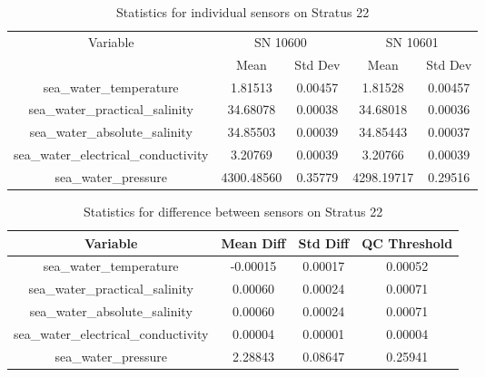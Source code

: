 \begin{table}[h]
\centering
\begin{tabular}{|c|c|c|c|c|}
\hline
Variable & \multicolumn{2}{c|}{SN 10600} & \multicolumn{2}{c|}{SN 10601} \\
& Mean & Std Dev & Mean & Std Dev \\
\hline
sea\_water\_temperature & 1.81513 & 0.00457 & 1.81528 & 0.00457 \\
sea\_water\_practical\_salinity & 34.68078 & 0.00038 & 34.68018 & 0.00036 \\
sea\_water\_absolute\_salinity & 34.85503 & 0.00039 & 34.85443 & 0.00037 \\
sea\_water\_electrical\_conductivity & 3.20769 & 0.00039 & 3.20766 & 0.00039 \\
sea\_water\_pressure & 4300.48560 & 0.35779 & 4298.19717 & 0.29516 \\
\hline
\end{tabular}
\caption{Statistics for individual sensors on Stratus 22}
\end{table}

\begin{table}[h]
\centering
\begin{tabular}{|c|c|c|c|}
\hline
Variable & Mean Diff & Std Diff & QC Threshold \\
\hline
sea\_water\_temperature & -0.00015 & 0.00017 & 0.00052 \\
sea\_water\_practical\_salinity & 0.00060 & 0.00024 & 0.00071 \\
sea\_water\_absolute\_salinity & 0.00060 & 0.00024 & 0.00071 \\
sea\_water\_electrical\_conductivity & 0.00004 & 0.00001 & 0.00004 \\
sea\_water\_pressure & 2.28843 & 0.08647 & 0.25941 \\
\hline
\end{tabular}
\caption{Statistics for difference between sensors on Stratus 22}
\end{table}
